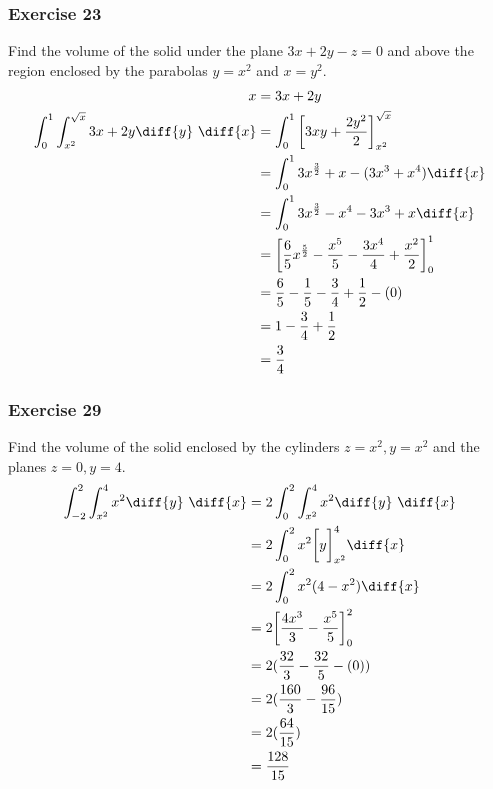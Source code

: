 \documentclass[letterpaper, 12pt]{math}
\begin{document}
\subsubsection*{Exercise 23}
Find the volume of the solid under the plane \( 3x+2y-z = 0 \) and above the
region enclosed by the parabolas \( y = x^2 \) and \( x = y^2 \).
\begin{align*}
  x &= 3x+2y \\
  \int_{0}^{1}\int_{x^2}^{\sqrt{x}}3x+2y\diff{y}~\diff{x} &=
    \int_{0}^{1}\bigg[3xy+\frac{2y^2}{2}\bigg]_{x^2}^{\sqrt{x}} \\
  &= \int_{0}^{1}3x^{\frac{3}{2}}+x-(3x^3+x^4)\diff{x} \\
  &= \int_{0}^{1}3x^{\frac{3}{2}}-x^4-3x^3+x\diff{x} \\
  &= \bigg[
    \frac{6}{5}x^{\frac{5}{2}}-\frac{x^5}{5}-\frac{3x^4}{4}+\frac{x^2}{2}
    \bigg]_{0}^{1} \\
  &= \frac{6}{5}-\frac{1}{5}-\frac{3}{4}+\frac{1}{2}-(0) \\
  &= 1-\frac{3}{4}+\frac{1}{2} \\
  &= \frac{3}{4}
\end{align*}

\subsubsection*{Exercise 29}
Find the volume of the solid enclosed by the cylinders \( z = x^2, y = x^2 \)
and the planes \( z = 0, y = 4 \).
\begin{align*}
  \int_{-2}^{2}\int_{x^2}^{4}x^2\diff{y}~\diff{x} &=
    2\int_{0}^{2}\int_{x^2}^{4}x^2\diff{y}~\diff{x} \\
  &= 2\int_{0}^{2}x^2\bigg[y\bigg]_{x^2}^{4}\diff{x} \\
  &= 2\int_{0}^{2}x^2(4-x^2)\diff{x} \\
  &= 2\bigg[\frac{4x^3}{3}-\frac{x^5}{5}\bigg]_{0}^{2} \\
  &= 2(\frac{32}{3}-\frac{32}{5}-(0)) \\
  &= 2(\frac{160}{3}-\frac{96}{15}) \\
  &= 2(\frac{64}{15}) \\
  &= \frac{128}{15}
\end{align*}
\end{document}
